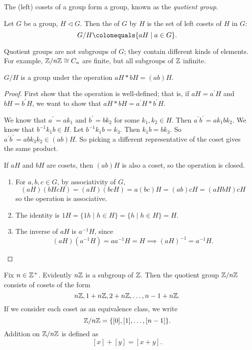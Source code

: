The (left) cosets of a group form a group, known as the \emph{quotient group}.

\begin{definition}
Let $G$ be a group, $H\triangleleft G$. Then the  of $G$ by $H$ is the set of left cosets of $H$ in $G$:
\[G/H\colonequals\{aH\mid a\in G\}.\]
\end{definition}

\begin{remark}
Quotient groups are not subgroups of $G$; they contain different kinds of elements. For example, $\mathbb Z/n\mathbb Z\cong C_n$ are finite, but all subgroups of $\mathbb Z$ infinite.
\end{remark}

\begin{lemma*}
$G/H$ is a group under the operation $aH\ast bH=(ab)H$.
\end{lemma*}

\begin{proof}
First show that the operation is well-defined; that is, if $aH=a^\prime H$ and $bH=b^\prime H$, we want to show that $aH\ast bH=a^\prime H\ast b^\prime H$. 

We know that $a^\prime=ak_1$ and $b^\prime=bk_2$ for some $k_1,k_2\in H$. Then $a^\prime b^\prime=ak_1bk_2$. We know that $b^{-1}k_1b\in H$. Let $b^{-1}k_1b=k_3$. Then $k_1b=bk_3$. So $a^\prime b^\prime=abk_3k_2\in(ab)H$. So picking a different representative of the coset gives the same product.

If $aH$ and $bH$ are cosets, then $(ab)H$ is also a coset, so the operation is closed.

\begin{enumerate}[label=(\roman*)]
\item For $a,b,c\in G$, by associativity of $G$,
\[(aH)(bHcH)=(aH)(bcH)=a(bc)H=(ab)cH=(aHbH)cH\]
so the operation is associative.
\item The identity is $1H=\{1h\mid h\in H\}=\{h\mid h\in H\}=H$.
\item The inverse of $aH$ is $a^{-1}H$, since
\[(aH)(a^{-1}H)=aa^{-1}H=H\implies(aH)^{-1}=a^{-1}H.\]
\end{enumerate}
\end{proof}

\begin{example}
Fix $n\in\mathbb Z^+$. 
Evidently $n\mathbb Z$ is a subgroup of $\mathbb Z$.
Then the quotient group $\mathbb Z/n\mathbb Z$ consists of cosets of the form
\[n\mathbb Z,1+n\mathbb Z,2+n\mathbb Z,\dots,n-1+n\mathbb Z.\]
If we consider each coset as an equivalence class, we write
\[\mathbb Z/n\mathbb Z=\{[0],[1],\dots,[n-1]\}.\]
Addition on $\mathbb Z/n\mathbb Z$ is defined as
\[[x]+[y]=[x+y].\]
\end{example}


